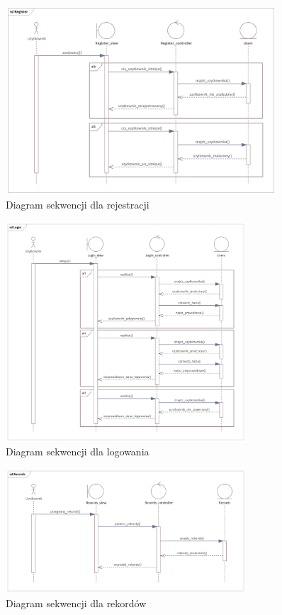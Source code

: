 \documentclass{sprz}
\begin{document}
\begin{figure}[h]
  \centering
  \includegraphics[width=0.9\textwidth]{sprz/sequence_register}
  \caption{Diagram sekwencji dla rejestracji}
  \label{img:sequence_register}
\end{figure}

\begin{figure}[h]
  \centering
  \includegraphics[width=0.8\textwidth]{sprz/sequence_login}
  \caption{Diagram sekwencji dla logowania}
  \label{img:sequence_login}
\end{figure}

\begin{figure}[h]
  \centering
  \includegraphics[width=0.8\textwidth]{sprz/sequence_records}
  \caption{Diagram sekwencji dla rekordów}
  \label{img:sequence_records}
\end{figure}

\printbibliography[title={Bibliografia}, heading=bibintoc]
\end{document}
